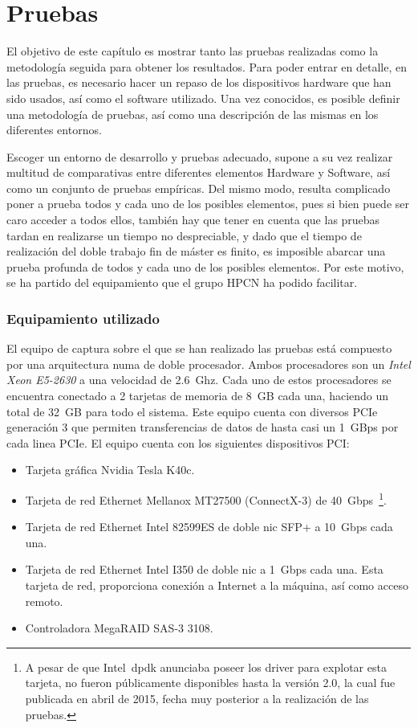 \chapter{Pruebas\label{sec:desarrollo}}

El objetivo de este capítulo es mostrar tanto las pruebas realizadas como la metodología seguida para obtener los resultados.
Para poder entrar en detalle, en las pruebas, es necesario hacer un repaso de los dispositivos hardware que han sido usados, así como el software utilizado. Una vez conocidos, es posible definir una metodología de pruebas, así como una descripción de las mismas en los diferentes entornos.


Escoger un entorno de desarrollo y pruebas adecuado, supone a su vez realizar multitud de comparativas entre diferentes elementos Hardware y Software, así como un conjunto de pruebas empíricas.
Del mismo modo, resulta complicado poner a prueba todos y cada uno de los posibles elementos, pues si bien puede ser caro acceder a todos ellos, también hay que tener en cuenta que las pruebas tardan en realizarse un tiempo no despreciable, y dado que el tiempo de realización del doble trabajo fin de máster es finito, es imposible abarcar una prueba profunda de todos y cada uno de los posibles elementos.
Por este motivo, se ha partido del equipamiento que el grupo HPCN ha podido facilitar.

\subsection{Equipamiento utilizado\label{sec:equipamiento}}

El equipo de captura sobre el que se han realizado las pruebas está compuesto por una arquitectura \gls{numa} de doble procesador.
Ambos procesadores son un \textit{Intel Xeon E5-2630} a una velocidad de 2.6~Ghz. Cada uno de estos procesadores se encuentra conectado a 2 tarjetas de memoria de 8~GB cada una, haciendo un total de 32~GB para todo el sistema.
Este equipo cuenta con diversos PCIe generación 3 que permiten transferencias de datos de hasta casi un 1~GBps por cada linea PCIe. El equipo cuenta con los siguientes dispositivos PCI:

\begin{itemize}
\item Tarjeta gráfica Nvidia Tesla K40c.
\item Tarjeta de red Ethernet Mellanox MT27500 (ConnectX-3) de 40~Gbps~\footnote{A pesar de que Intel~\gls{dpdk} anunciaba poseer los driver para explotar esta tarjeta, no fueron públicamente disponibles hasta la versión 2.0, la cual fue publicada en abril de 2015, fecha muy posterior a la realización de las pruebas.}.
\item Tarjeta de red Ethernet Intel 82599ES de doble \gls{nic} SFP+ a 10~Gbps cada una.
\item Tarjeta de red Ethernet Intel I350 de doble \gls{nic} a 1~Gbps cada una. Esta tarjeta de red, proporciona conexión a Internet a la máquina, así como acceso remoto.
\item Controladora MegaRAID SAS-3 3108.
\end{itemize}

